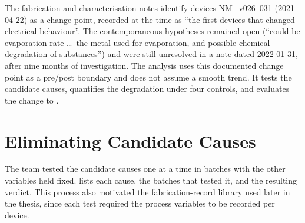 \documentclass[12pt, twoside]{report}
\begin{document}
The fabrication and characterisation notes identify devices NM\_v026--031 (2021-04-22) as a change point, recorded at the time as ``the first devices that changed electrical behaviour''. The contemporaneous hypotheses remained open (``could be evaporation rate \ldots\ the metal used for evaporation, and possible chemical degradation of substances'') and were still unresolved in a note dated 2022-01-31, after nine months of investigation. The analysis uses this documented change point as a pre/post boundary and does not assume a smooth trend. It tests the candidate causes, quantifies the degradation under four controls, and evaluates the change to \PEO{}.

\section{Eliminating Candidate Causes}\label{sec:bridge_elimination}

The team tested the candidate causes one at a time in batches with the other variables held fixed.  lists each cause, the batches that tested it, and the resulting verdict. This process also motivated the fabrication-record library used later in the thesis, since each test required the process variables to be recorded per device.
\end{document}
